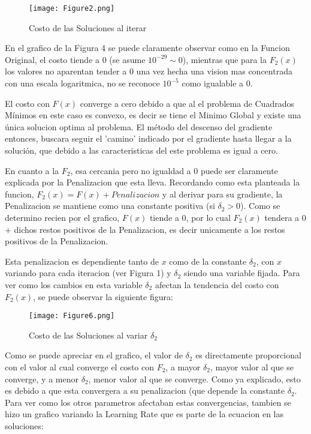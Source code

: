 \documentclass{article}
\begin{document}
\begin{figure}[ht]
    \centering
    \caption{Costo de las Soluciones al iterar}
    \texttt{[image: Figure2.png]}
    \label{fig:Image 1}
\end{figure}

\noindent En el grafico de la Figura 4 se puede claramente observar como en la Funcion Original, el costo tiende a $0$ (se asume $10^{-29} \sim 0$), mientras que para la $F_2(x)$ los valores no aparentan tender a $0$ una vez hecha una vision mas concentrada con una escala logaritmica, no se reconoce $10^{-5}$ como igualable a $0$. \vspace{\baselineskip}

\noindent El costo con $F(x)$ converge a cero debido a que al el problema de Cuadrados Mínimos en este caso es convexo, es decir se tiene el Minimo Global y existe una única solucion optima al problema. El método del descenso del gradiente entonces, buscara seguir el 'camino' indicado por el gradiente hasta llegar a la solución, que debido a las caracteristicas del este problema es igual a cero. 
\vspace{\baselineskip}

\noindent En cuanto a la $F_2$, esa cercania pero no igualdad a $0$ puede ser claramente explicada por la Penalizacion que esta lleva. Recordando como esta planteada la funcion, $F_2(x) = F(x) + Penalizacion$ y al derivar para su gradiente, la Penalizacion se mantiene como una constante positiva (si $\delta_2 > 0$). Como se determino recien por el grafico, $F(x)$ tiende a $0$, por lo cual $F_2(x)$ tendera a $0$ $+$ dichos restos positivos de la Penalizacion, es decir unicamente a los restos positivos de la Penalizacion. \vspace{\baselineskip}

\noindent Esta penalizacion es dependiente tanto de $x$ como de la constante $\delta_2$, con $x$ variando para cada iteracion (ver Figura 1) y $\delta_2$ siendo una variable fijada. Para ver como los cambios en esta variable $\delta_2$ afectan la tendencia del costo con $F_2(x)$, se puede observar la siguiente figura:

\begin{figure}[ht]
    \centering
    \caption{Costo de las Soluciones al variar $\delta_2$}
    \texttt{[image: Figure6.png]}
    \label{fig:Image 1}
\end{figure}

\noindent Como se puede apreciar en el grafico, el valor de $\delta_2$ es directamente proporcional con el valor al cual converge el costo con $F_2$, a mayor $\delta_2$, mayor valor al que se converge, y a menor $\delta_2$, menor valor al que se converge. Como ya explicado, esto es debido a que esta convergera a su penalizacion (que depende la constante $\delta_2$. Para ver como los otros parametros afectaban estas convergencias, tambien se hizo un grafico variando la Learning Rate que es parte de la ecuacion en las soluciones:
\vspace{2\baselineskip}
\end{document}
